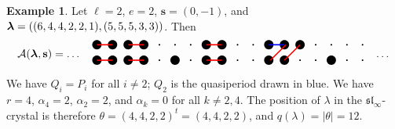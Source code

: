 \documentclass[12pt]{amsart}
\numberwithin{equation}{section}
\theoremstyle{definition}
\newtheorem{example}[equation]{Example}
\newcommand\TikZ[1]{\begin{matrix}\begin{tikzpicture}#1\end{tikzpicture}\end{matrix}}
\newcommand{\slinf}{\mathfrak{sl}_\infty}
\newcommand{\mbs}{\mathbf{s}}
\begin{document}
\begin{example}
Let $\ell=2$, $e=2$, $\mbs=(0,-1)$, and $\bla=((6,4,4,2,2,1),(5,5,5,3,3))$. Then $$\cA(\bla,\bs)=\dots\quad
\TikZ{[scale=.5]
\draw
(8,0)node[fill,circle,inner sep=.5pt]{}
(7,0)node[fill,circle,inner sep=.5pt]{}
(6,0)node[fill,circle,inner sep=3pt]{}
(5,0)node[fill,circle,inner sep=.5pt]{}
(4,0)node[fill,circle,inner sep=.5pt]{}
(3,0)node[fill,circle,inner sep=3pt]{}
(2,0)node[fill,circle,inner sep=3pt]{}
(1,0)node[fill,circle,inner sep=.5pt]{}
(0,0)node[fill,circle,inner sep=.5pt]{}
(-1,0)node[fill,circle,inner sep=3pt]{}
(-2,0)node[fill,circle,inner sep=3pt]{}
(-3,0)node[fill,circle,inner sep=.5pt]{}
(-4,0)node[fill,circle,inner sep=3pt]{}
(-5,0)node[fill,circle,inner sep=.5pt]{}
(-6,0)node[fill,circle,inner sep=3pt]{}
(-7,0)node[fill,circle,inner sep=3pt]{}
(-8,0)node[fill,circle,inner sep=3pt]{}
(-9,0)node[fill,circle,inner sep=3pt]{}
(8,1)node[fill,circle,inner sep=.5pt]{}
(7,1)node[fill,circle,inner sep=.5pt]{}
(6,1)node[fill,circle,inner sep=.5pt]{}
(5,1)node[fill,circle,inner sep=.5pt]{}
(4,1)node[fill,circle,inner sep=3pt]{}
(3,1)node[fill,circle,inner sep=3pt]{}
(2,1)node[fill,circle,inner sep=3pt]{}
(1,1)node[fill,circle,inner sep=.5pt]{}
(0,1)node[fill,circle,inner sep=.5pt]{}
(-1,1)node[fill,circle,inner sep=3pt]{}
(-2,1)node[fill,circle,inner sep=3pt]{}
(-3,1)node[fill,circle,inner sep=.5pt]{}
(-4,1)node[fill,circle,inner sep=.5pt]{}
(-5,1)node[fill,circle,inner sep=.5pt]{}
(-6,1)node[fill,circle,inner sep=3pt]{}
(-7,1)node[fill,circle,inner sep=3pt]{}
(-8,1)node[fill,circle,inner sep=3pt]{}
(-9,1)node[fill,circle,inner sep=3pt]{}
;


\draw[very thick,red] plot [smooth,tension=.1] coordinates{(4,1)(3,0)};
\draw[very thick,red] plot [smooth,tension=.1] coordinates{(3.1,1)(2.1,0)};
\draw[very thick,blue] plot [smooth,tension=.1] coordinates{(3,1)(2,1)};
\draw[very thick,red] plot [smooth,tension=.1] coordinates{(-1,1)(-2,1)};
\draw[very thick,red] plot [smooth,tension=.1] coordinates{(-1,0)(-2,0)};
\draw[very thick,red] plot [smooth,tension=.1] coordinates{(-6,1)(-7,1)};
\draw[very thick,red] plot [smooth,tension=.1] coordinates{(-6,0)(-7,0)};
\draw[very thick,red] plot [smooth,tension=.1] coordinates{(-8,1)(-9,1)};
\draw[very thick,red] plot [smooth,tension=.1] coordinates{(-8,0)(-9,0)};

}\quad\dots
$$
We have $Q_i=P_i$ for all $i\neq 2$; $Q_2$ is the quasiperiod drawn in blue. We have $r=4$, $\alpha_4=2$, $\alpha_2=2$, and $\alpha_k=0$ for all $k\neq 2,4$. The position of $\lambda$ in the $\slinf$-crystal is therefore $\theta=(4,4,2,2)^t=(4,4,2,2)$, and $q(\lambda)=|\theta|=12$.
\end{example}
\end{document}
